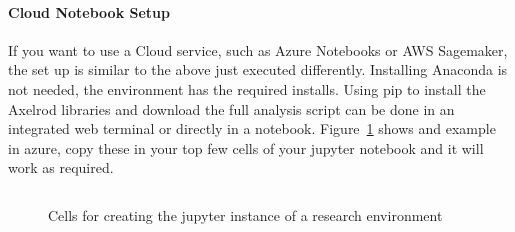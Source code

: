 \paragraph{Cloud Notebook Setup} 
If you want to use a Cloud service, such as Azure Notebooks or AWS Sagemaker, the set up is similar to the above just executed differently.
Installing Anaconda is not needed, the environment has the required installs.
Using pip to install the Axelrod libraries and download the full analysis script can be done in an integrated web terminal or directly in a notebook.
Figure~\ref{code:jupyterExample} shows and example in azure, copy these in your top few cells of your jupyter notebook and it will work as required.

\begin{figure}[h]
    \centering
    \inputminted{python}{code_snippets/jupyterCells.py}
    \caption{Cells for creating the jupyter instance of a research environment}\label{code:jupyterExample}
\end{figure}